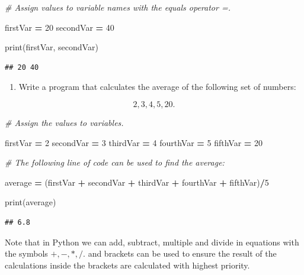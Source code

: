 \documentclass[
]{book}
\newenvironment{Shaded}{\begin{snugshade}}{\end{snugshade}}
\newcommand{\BuiltInTok}[1]{#1}
\newcommand{\CommentTok}[1]{\textcolor[rgb]{0.56,0.35,0.01}{\textit{#1}}}
\newcommand{\DecValTok}[1]{\textcolor[rgb]{0.00,0.00,0.81}{#1}}
\newcommand{\NormalTok}[1]{#1}
\newcommand{\OperatorTok}[1]{\textcolor[rgb]{0.81,0.36,0.00}{\textbf{#1}}}
\providecommand{\tightlist}{%
  \setlength{\itemsep}{0pt}\setlength{\parskip}{0pt}}
\begin{document}
\begin{Shaded}
\begin{Highlighting}[]
\CommentTok{\# Assign values to variable names with the \textquotesingle{}equals\textquotesingle{} operator \textquotesingle{}=\textquotesingle{}.}

\NormalTok{firstVar }\OperatorTok{=} \DecValTok{20}
\NormalTok{secondVar }\OperatorTok{=} \DecValTok{40}

\BuiltInTok{print}\NormalTok{(firstVar, secondVar)}
\end{Highlighting}
\end{Shaded}

\begin{verbatim}
## 20 40
\end{verbatim}

\begin{enumerate}
\def\labelenumi{\arabic{enumi}.}
\setcounter{enumi}{2}
\tightlist
\item
  Write a program that calculates the average of the following set of numbers:
\end{enumerate}

\[2,3,4,5,20.\]

\begin{Shaded}
\begin{Highlighting}[]
\CommentTok{\# Assign the values to variables.}

\NormalTok{firstVar }\OperatorTok{=} \DecValTok{2}
\NormalTok{secondVar }\OperatorTok{=} \DecValTok{3}
\NormalTok{thirdVar }\OperatorTok{=} \DecValTok{4}
\NormalTok{fourthVar }\OperatorTok{=} \DecValTok{5}
\NormalTok{fifthVar }\OperatorTok{=} \DecValTok{20}

\CommentTok{\# The following line of code can be used to find the average:}

\NormalTok{average }\OperatorTok{=}\NormalTok{ (firstVar }\OperatorTok{+}\NormalTok{ secondVar }\OperatorTok{+}\NormalTok{ thirdVar }\OperatorTok{+}\NormalTok{ fourthVar }\OperatorTok{+}\NormalTok{ fifthVar)}\OperatorTok{/}\DecValTok{5}

\BuiltInTok{print}\NormalTok{(average)}
\end{Highlighting}
\end{Shaded}

\begin{verbatim}
## 6.8
\end{verbatim}

Note that in Python we can add, subtract, multiple and divide in equations with the symbols \(+, -, *, /.\) and brackets can be used to ensure the result of the calculations inside the brackets are calculated with highest priority.
\end{document}

